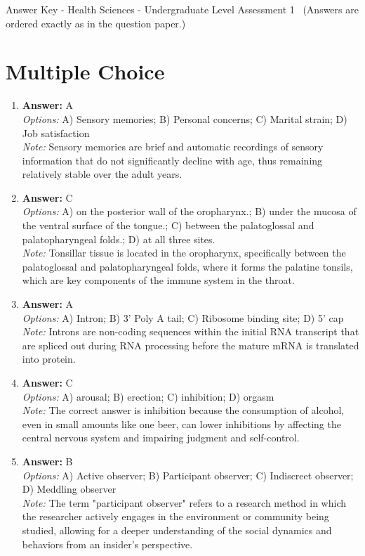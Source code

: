 \documentclass[12pt]{article}
\begin{document}
\begin{center}
Answer Key - Health Sciences - Undergraduate Level Assessment 1 \
\small (Answers are ordered exactly as in the question paper.)
\end{center}

\section*{Multiple Choice}
\begin{enumerate}[label=\arabic*.]
\item \textbf{Answer:} A
\\ \textit{Options:} A) Sensory memories; B) Personal concerns; C) Marital strain; D) Job satisfaction
\\ \textit{Note:} Sensory memories are brief and automatic recordings of sensory information that do not significantly decline with age, thus remaining relatively stable over the adult years.
\item \textbf{Answer:} C
\\ \textit{Options:} A) on the posterior wall of the oropharynx.; B) under the mucosa of the ventral surface of the tongue.; C) between the palatoglossal and palatopharyngeal folds.; D) at all three sites.
\\ \textit{Note:} Tonsillar tissue is located in the oropharynx, specifically between the palatoglossal and palatopharyngeal folds, where it forms the palatine tonsils, which are key components of the immune system in the throat.
\item \textbf{Answer:} A
\\ \textit{Options:} A) Intron; B) 3' Poly A tail; C) Ribosome binding site; D) 5' cap
\\ \textit{Note:} Introns are non-coding sequences within the initial RNA transcript that are spliced out during RNA processing before the mature mRNA is translated into protein.
\item \textbf{Answer:} C
\\ \textit{Options:} A) arousal; B) erection; C) inhibition; D) orgasm
\\ \textit{Note:} The correct answer is inhibition because the consumption of alcohol, even in small amounts like one beer, can lower inhibitions by affecting the central nervous system and impairing judgment and self-control.
\item \textbf{Answer:} B
\\ \textit{Options:} A) Active observer; B) Participant observer; C) Indiscreet observer; D) Meddling observer
\\ \textit{Note:} The term "participant observer" refers to a research method in which the researcher actively engages in the environment or community being studied, allowing for a deeper understanding of the social dynamics and behaviors from an insider's perspective.
\end{enumerate}
\end{document}
